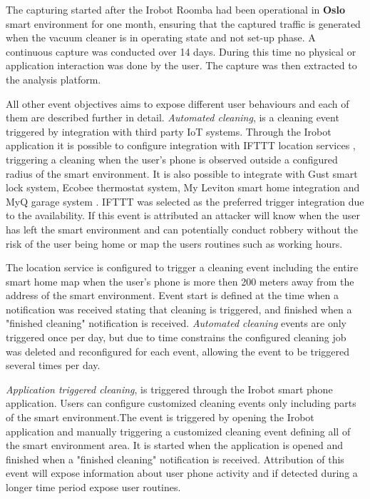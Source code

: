The capturing started after the Irobot Roomba had been operational in \textbf{Oslo} smart environment for one month, ensuring that the captured traffic is generated when the vacuum cleaner is in operating state and not set-up phase. A continuous capture was conducted over 14 days. During this time no physical or application interaction was done by the user. The capture was then extracted to the analysis platform.

All other event objectives aims to expose different user behaviours and each of them are described further in detail. \textit{Automated cleaning}, is a cleaning event triggered by integration with third party \gls{IoT} systems. Through the Irobot application it is possible to configure integration with IFTTT location services \cite{ifttt}, triggering a cleaning when the user's phone is observed outside a configured radius of the smart environment. It is also possible to integrate with Gust smart lock system, Ecobee thermostat system, My Leviton smart home integration and MyQ garage system \cite{irobot}. IFTTT was selected as the preferred trigger integration due to the availability. If this event is attributed an attacker will know when the user has left the smart environment and can potentially conduct robbery without the risk of the user being home or map the users routines such as working hours.

The location service is configured to trigger a cleaning event including the entire smart home map when the user's phone is more then 200 meters away from the address of the smart environment. Event start is defined at the time when a notification was received stating that cleaning is triggered, and finished when a "finished cleaning" notification is received. \textit{Automated cleaning} events are only triggered once per day, but due to time constrains the configured cleaning job was deleted and reconfigured for each event, allowing the event to be triggered several times per day.  

\textit{Application triggered cleaning}, is triggered through the Irobot smart phone application. Users can configure customized cleaning events only including parts of the smart environment.The event is triggered by opening the Irobot application and manually triggering a customized cleaning event defining all of the smart environment area. It is started when the application is opened and finished when a "finished cleaning" notification is received. Attribution of this event will expose information about user phone activity and if detected during a longer time period expose user routines. 


